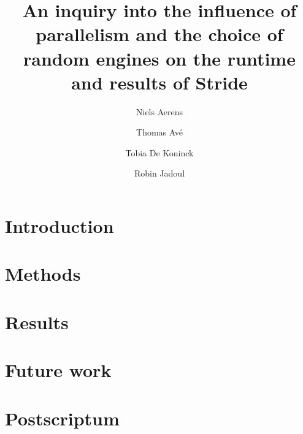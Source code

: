 \documentclass[natbib=true]{acmart}
\title{An inquiry into the influence of parallelism and the choice of random
engines on the runtime and results of Stride}
\author{Niels Aerens}
\author{Thomas Avé}
\author{Tobia De Koninck}
\author{Robin Jadoul}
\begin{document}
\maketitle

\section{Introduction}

\pagebreak

\section{Methods}

\section{Results}

\section{Future work}

\section{Postscriptum}

\clearpage



\end{document}
